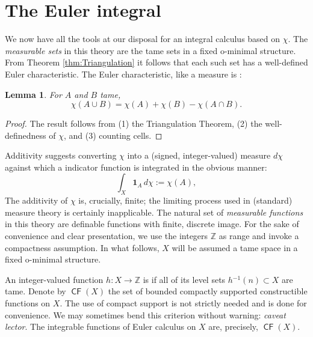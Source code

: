 \documentclass{psapm-l}
\newtheorem{lemma}[theorem]{Lemma}
\theoremstyle{definition}
\theoremstyle{remark}
\numberwithin{equation}{section}
\begin{document}
\section{The Euler integral}
\label{sec:integral}

We now have all the tools at our disposal for an integral calculus based on $\chi$. The {\em measurable sets} in this theory are the tame sets in a fixed o-minimal structure. From Theorem \ref{thm:Triangulation} it follows that each such set has a well-defined Euler characteristic. The Euler characteristic, like a measure is {{}}:

\begin{lemma}
\label{lem:MVchi}
For $A$ and $B$ tame,
\begin{equation}
\label{eq:MVchi}
    \chi(A\cup B) = \chi(A) + \chi(B) - \chi(A\cap B).
\end{equation}
\end{lemma}
\begin{proof}
The result follows from (1) the Triangulation Theorem, (2) the well-definedness of $\chi$, and (3) counting cells.
\end{proof}

Additivity suggests converting $\chi$ into a (signed, integer-valued) measure $d\chi$ against which a indicator function is integrated in the obvious manner:
\begin{equation}
\label{eq:intchar}
    \int_X {{\mathbf{1}}}_A\,d\chi := \chi(A) ,
\end{equation}
The additivity of $\chi$ is, crucially, finite; the limiting process used in (standard) measure theory is certainly inapplicable. The natural set of {\em measurable functions} in this theory are definable functions with finite, discrete image. For the sake of convenience and clear presentation, we use the integers ${{\mathbb Z}}$ as range and invoke a compactness assumption. In what follows, $X$ will be assumed a tame space in a fixed o-minimal structure.

An integer-valued function $h\colon X\to{{\mathbb Z}}$ is {{}} if all of its level sets $h{^{-1}}(n)\subset X$ are tame. Denote by ${{{\operatorname{\mathsf{{CF}}}}}}(X)$ the set of bounded compactly supported constructible functions on $X$. The use of compact support is not strictly needed and is done for convenience. We may sometimes bend this criterion without warning: {\em caveat lector}. The integrable functions of Euler calculus on $X$ are, precisely, ${{{\operatorname{\mathsf{{CF}}}}}}(X)$.
\end{document}
